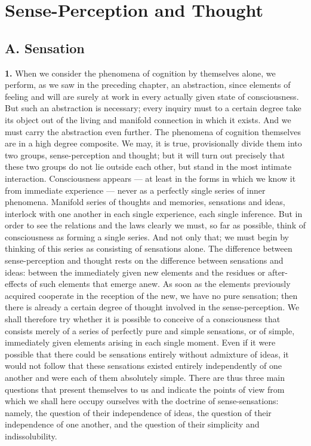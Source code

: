 \documentclass[12pt,a4paper]{book}
\newcommand{\opage}[1]{\marginnote{\footnotesize\textit{[#1]}}}
\begin{document}
\chapter[Sense-Perception and Thought]{Sense-Perception and Thought\opage{120}}

\section*{A. Sensation}

\noindent\textbf{1.} When we consider the phenomena of cognition by
themselves alone, we perform, as we saw in the preceding chapter, an
abstraction, since elements of feeling and will are surely at work in
every actually given state of consciousness. But such an abstraction is
necessary; every inquiry must to a certain degree take its object out
of the living and manifold connection in which it exists. And we must
carry the abstraction even further. The phenomena of cognition
themselves are in a high degree composite. We may, it is true,
provisionally divide them into two groups, sense-perception and thought;
but it will turn out precisely that these two groups do not lie outside
each other, but stand in the most intimate interaction. Consciousness
appears --- at least in the forms in which we know it from immediate
experience --- never as a perfectly single series of inner phenomena.
Manifold series of thoughts and memories, sensations and ideas, interlock
with one another in each single experience, each single inference. But
in order to see the relations and the laws clearly we must, so far as
possible, think of consciousness as forming a single series. And not only
that; we must begin by thinking of this series as consisting of
sensations alone. The difference between sense-perception and thought
rests on the difference between sensations and ideas: between the
immediately given new elements and the residues or after-effects of such
elements that emerge anew. As soon as the elements previously acquired
cooperate
\opage{121}in the reception of the new, we have no pure sensation; then
there is already a certain degree of thought involved in the
sense-perception. We shall therefore try whether it is possible to
conceive of a consciousness that consists merely of a series of
perfectly pure and simple sensations, or of simple, immediately given
elements arising in each single moment. Even if it were possible that
there could be sensations entirely without admixture of ideas, it would
not follow that these sensations existed entirely independently of one
another and were each of them absolutely simple. There are thus three
main questions that present themselves to us and indicate the points of
view from which we shall here occupy ourselves with the doctrine of
sense-sensations: namely, the question of their independence of ideas,
the question of their independence of one another, and the question of
their simplicity and indissolubility.
\end{document}
